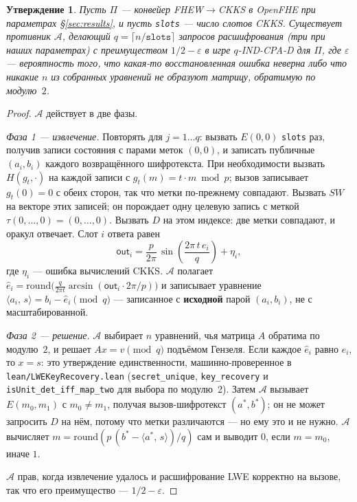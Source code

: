 \documentclass[11pt]{article}
\newtheorem{proposition}{Утверждение}
\newcommand{\inner}[2]{\langle #1,\, #2\rangle}
\newcommand{\fto}{\texorpdfstring{FHEW$\to$CKKS}{FHEW-to-CKKS}}
\newcommand{\out}{\mathsf{out}}
\newcommand{\code}[1]{\texttt{#1}}
\begin{document}
\begin{proposition}
Пусть $\Pi$ --- конвейер \fto{} в OpenFHE при параметрах \S\ref{sec:results}, и пусть \code{slots}
--- число слотов CKKS. Существует противник $\mathcal{A}$, делающий $q = \lceil n/\code{slots}\rceil$
запросов расшифрования (три при наших параметрах) с преимуществом $1/2 - \varepsilon$ в игре
$q$-IND-CPA-D для $\Pi$, где $\varepsilon$ --- вероятность того, что какая-то восстановленная ошибка
неверна либо что никакие $n$ из собранных уравнений не образуют матрицу, обратимую по модулю~$2$.
\end{proposition}

\begin{proof}
$\mathcal{A}$ действует в две фазы.

\emph{Фаза 1 --- извлечение.} Повторять для $j = 1 \dots q$: вызвать $E(0, 0)$ \code{slots} раз,
получив записи состояния с парами меток $(0, 0)$, и записать публичные $(a_i, b_i)$ каждого
возвращённого шифротекста. При необходимости вызвать $H(g_t, \cdot)$ на каждой записи с
$g_t(m) = t\cdot m \bmod p$; вызов записывает $g_t(0) = 0$ с обеих сторон, так что метки по-прежнему
совпадают. Вызвать $\mathit{SW}$ на векторе этих записей; он порождает одну целевую запись с меткой
$\tau(0, \dots, 0) = (0, \dots, 0)$. Вызвать $D$ на этом индексе: две метки совпадают, и оракул
отвечает. Слот $i$ ответа равен
\[
  \out_i = \frac{p}{2\pi}\,\sin\!\left(\frac{2\pi\,t\,e_i}{q}\right) + \eta_i,
\]
где $\eta_i$ --- ошибка вычислений CKKS. $\mathcal{A}$ полагает
$\hat{e}_i = \mathrm{round}\!\big(\tfrac{q}{2\pi t}\arcsin(\out_i \cdot 2\pi/p)\big)$ и записывает
уравнение $\inner{a_i}{s} = b_i - \hat{e}_i \pmod q$ --- записанное с \textbf{исходной} парой
$(a_i, b_i)$, не с масштабированной.

\emph{Фаза 2 --- решение.} $\mathcal{A}$ выбирает $n$ уравнений, чья матрица $A$ обратима по
модулю~$2$, и решает $A x = v \pmod q$ подъёмом Гензеля. Если каждое $\hat{e}_i$ равно $e_i$, то
$x = s$: это утверждение единственности, машинно-проверенное в
\code{lean/LWEKeyRecovery.lean} (\code{secret\_unique}, \code{key\_recovery} и
\code{isUnit\_det\_iff\_map\_two} для выбора по модулю~2). Затем $\mathcal{A}$ вызывает
$E(m_0, m_1)$ с $m_0 \neq m_1$, получая вызов-шифротекст $(a^*, b^*)$; он не может запросить $D$ на
нём, потому что метки различаются --- но ему это и не нужно. $\mathcal{A}$ вычисляет
$m = \mathrm{round}(p\,(b^* - \inner{a^*}{s})/q)$ сам и выводит $0$, если $m = m_0$, иначе $1$.

$\mathcal{A}$ прав, когда извлечение удалось и расшифрование LWE корректно на вызове, так что его
преимущество --- $1/2 - \varepsilon$.
\end{proof}
\end{document}
